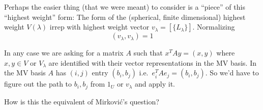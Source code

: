 Perhaps the easier thing (that we were meant) to consider is a ``piece'' of this ``highest weight'' form: The form of the (spherical, finite dimensional) highest weight $V(\lambda)$ irrep with highest weight vector $v_\lambda = [\{L_\lambda\}]$. Normalizing 
\begin{equation}
    (v_\lambda,v_\lambda) = 1
\end{equation}

In any case we are asking for a matrix $A$ such that $x^T A y = (x,y)$ where $x,y\in V$ or $V_\lambda$ are identified with their vector representations in the MV basis. In the MV basis $A$ has $(i,j)$ entry $(b_i,b_j)$ i.e.\ $e_i^T A e_j = (b_i,b_j)$. So we'd have to figure out the path to $b_i, b_j$ from $1_U$ or $v_\lambda$ and apply it. 

\begin{question}
    How is this the equivalent of Mirkovi\'c's question? 
\end{question}

% 
